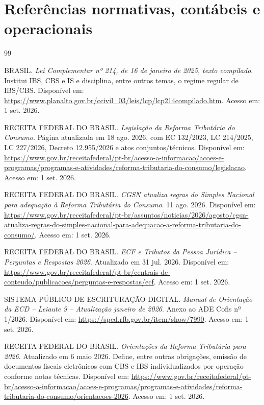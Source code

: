 \documentclass[11pt,a4paper]{article}
\begin{document}
\section{Referências normativas, contábeis e operacionais}

\begin{thebibliography}{99}

BRASIL. \textit{Lei Complementar nº 214, de 16 de janeiro de 2025, texto compilado}. Institui IBS, CBS e IS e disciplina, entre outros temas, o regime regular de IBS/CBS. Disponível em: \url{https://www.planalto.gov.br/ccivil_03/leis/lcp/lcp214compilado.htm}. Acesso em: 1 set. 2026.

RECEITA FEDERAL DO BRASIL. \textit{Legislação da Reforma Tributária do Consumo}. Página atualizada em 18 ago. 2026, com EC 132/2023, LC 214/2025, LC 227/2026, Decreto 12.955/2026 e atos conjuntos/técnicos. Disponível em: \url{https://www.gov.br/receitafederal/pt-br/acesso-a-informacao/acoes-e-programas/programas-e-atividades/reforma-tributaria-do-consumo/legislacao}. Acesso em: 1 set. 2026.

RECEITA FEDERAL DO BRASIL. \textit{CGSN atualiza regras do Simples Nacional para adequação à Reforma Tributária do Consumo}. 11 ago. 2026. Disponível em: \url{https://www.gov.br/receitafederal/pt-br/assuntos/noticias/2026/agosto/cgsn-atualiza-regras-do-simples-nacional-para-adequacao-a-reforma-tributaria-do-consumo/}. Acesso em: 1 set. 2026.

RECEITA FEDERAL DO BRASIL. \textit{ECF e Tributos da Pessoa Jurídica -- Perguntas e Respostas 2026}. Atualizado em 31 jul. 2026. Disponível em: \url{https://www.gov.br/receitafederal/pt-br/centrais-de-conteudo/publicacoes/perguntas-e-respostas/ecf}. Acesso em: 1 set. 2026.

SISTEMA PÚBLICO DE ESCRITURAÇÃO DIGITAL. \textit{Manual de Orientação da ECD -- Leiaute 9 -- Atualização janeiro de 2026}. Anexo ao ADE Cofis nº 1/2026. Disponível em: \url{https://sped.rfb.gov.br/item/show/7990}. Acesso em: 1 set. 2026.

RECEITA FEDERAL DO BRASIL. \textit{Orientações da Reforma Tributária para 2026}. Atualizado em 6 maio 2026. Define, entre outras obrigações, emissão de documentos fiscais eletrônicos com CBS e IBS individualizados por operação conforme notas técnicas. Disponível em: \url{https://www.gov.br/receitafederal/pt-br/acesso-a-informacao/acoes-e-programas/programas-e-atividades/reforma-tributaria-do-consumo/orientacoes-2026}. Acesso em: 1 set. 2026.


\end{thebibliography}
\end{document}
